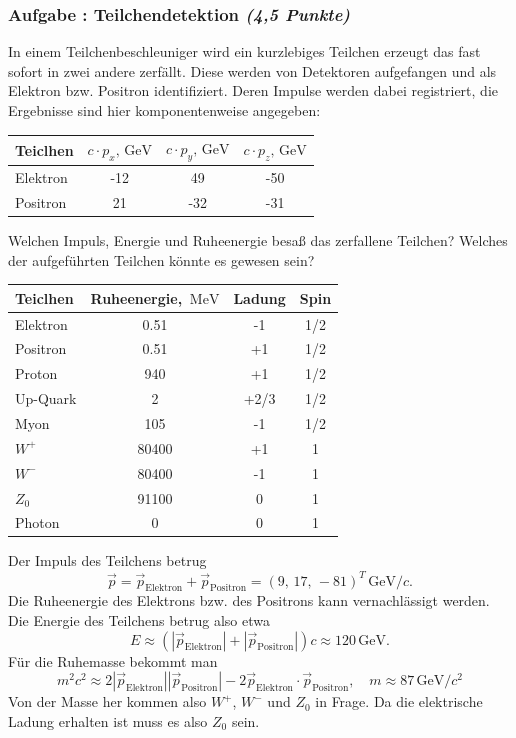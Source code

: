 \documentclass[12pt,a4paper]{article}
\newcommand{\unit}[1]{\,\mathrm{#1}}
\newcounter{numlabel}
\newenvironment{problem}[2]{\stepcounter{numlabel} \vspace{1ex} \subsubsection*{Aufgabe \the\value{numlabel}: #1 \emph{(#2 Punkte)}} \renewcommand{\Currentlabel}{Aufgabe \the\value{numlabel}: #1}}{

}
\begin{document}
\begin{problem}{Teilchendetektion}{4,5}
In einem Teilchenbeschleuniger wird ein kurzlebiges Teilchen erzeugt das fast sofort in zwei andere zerfällt. Diese werden von Detektoren aufgefangen und als Elektron bzw. Positron identifiziert. Deren Impulse werden dabei registriert, die Ergebnisse sind hier komponentenweise angegeben:
\begin{center}
\begin{tabular}{lccc}
\toprule
Teiclhen & $c \cdot p_x, \unit{GeV}$ & $c \cdot p_y, \unit{GeV}$ & $c \cdot p_z, \unit{GeV}$ \\
\midrule
Elektron & -12 & 49 & -50 \\
Positron & 21 & -32 & -31 \\
\bottomrule
\end{tabular}
\end{center}
Welchen Impuls, Energie und Ruheenergie besaß das zerfallene Teilchen? Welches der aufgeführten Teilchen könnte es gewesen sein?
\begin{center}
\begin{tabular}{lccc}
\toprule
Teiclhen & Ruheenergie, $\unit{MeV}$ & Ladung & Spin \\
\midrule
Elektron & 0.51 & -1 & 1/2 \\
Positron & 0.51 & +1 & 1/2 \\
Proton & 940 & +1 & 1/2 \\
Up-Quark & 2 & +2/3 & 1/2 \\
Myon & 105 & -1 & 1/2 \\
$W^+$ & 80400 & +1 & 1 \\
$W^-$ & 80400 & -1 & 1 \\
$Z_0$ & 91100 & 0 & 1 \\
Photon & 0 & 0 & 1 \\
\bottomrule
\end{tabular}
\end{center}
\begin{solution}
Der Impuls des Teilchens betrug
\[
\vec p = \vec p_\mathrm{Elektron} + \vec p_\mathrm{Positron} = (9,\, 17,\, -81)^T \unit{GeV}/c.
\]
Die Ruheenergie des Elektrons bzw. des Positrons kann vernachlässigt werden. Die Energie des Teilchens betrug also etwa
\[
E \approx (|\vec p_\mathrm{Elektron}| + |\vec p_\mathrm{Positron}|) c \approx 120 \unit{GeV}.
\]
Für die Ruhemasse bekommt man
\[
m^2 c^2 \approx 2 |\vec p_\mathrm{Elektron}|  |\vec p_\mathrm{Positron}| - 2 \vec p_\mathrm{Elektron} \cdot \vec p_\mathrm{Positron}, \quad m \approx 87 \unit{GeV} / c^2
\]
Von der Masse her kommen also $W^+$, $W^-$ und $Z_0$ in Frage. Da die elektrische Ladung erhalten ist muss es also $Z_0$ sein.
\end{solution}
\end{problem}
\end{document}
